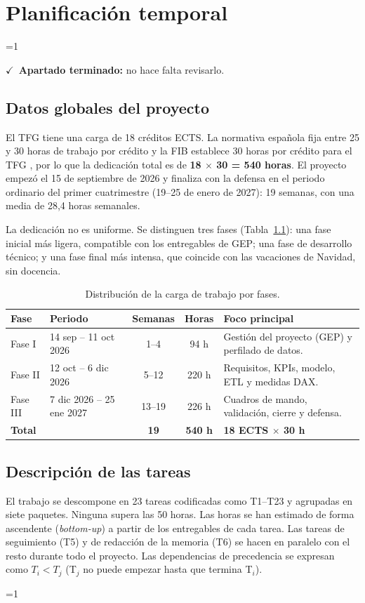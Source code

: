 \documentclass[12pt, a4paper, oneside]{report}
\newcommand{\mostrarterminados}{1}
\newenvironment{revisado}
  {\ifnum\mostrarterminados=1\relax\begin{cajarevisada}\noindent\colorbox{verdeterminado}{\parbox{\dimexpr\linewidth-2\fboxsep\relax}{\small$\checkmark$\ \textbf{Apartado terminado:} no hace falta revisarlo.}}\par\medskip\fi}
  {\ifnum\mostrarterminados=1\relax\end{cajarevisada}\fi}
\begin{document}
\chapter{Planificación temporal}
\begin{revisado}

\section{Datos globales del proyecto}
El TFG tiene una carga de 18 créditos ECTS. La normativa española fija entre 25 y 30 horas de trabajo por crédito \cite{boe_rd1125_2003} y la FIB establece 30 horas por crédito para el TFG \cite{fib_normativa_tfg}, por lo que la dedicación total es de \textbf{18 $\times$ 30 = 540 horas}. El proyecto empezó el 15 de septiembre de 2026 y finaliza con la defensa en el periodo ordinario del primer cuatrimestre (19--25 de enero de 2027): 19 semanas, con una media de 28,4 horas semanales.

La dedicación no es uniforme. Se distinguen tres fases (Tabla~\ref{tab:fases}): una fase inicial más ligera, compatible con los entregables de GEP; una fase de desarrollo técnico; y una fase final más intensa, que coincide con las vacaciones de Navidad, sin docencia.

\begin{table}[H]
\centering
\small
\renewcommand{\arraystretch}{1.1}
\begin{tabularx}{\textwidth}{@{} p{1.6cm} p{4.2cm} c c X @{}}
\toprule
\textbf{Fase} & \textbf{Periodo} & \textbf{Semanas} & \textbf{Horas} & \textbf{Foco principal} \\ \midrule
Fase I & 14 sep -- 11 oct 2026 & 1--4 & 94 h & Gestión del proyecto (GEP) y perfilado de datos. \\
Fase II & 12 oct -- 6 dic 2026 & 5--12 & 220 h & Requisitos, KPIs, modelo, ETL y medidas DAX. \\
Fase III & 7 dic 2026 -- 25 ene 2027 & 13--19 & 226 h & Cuadros de mando, validación, cierre y defensa. \\ \midrule
\textbf{Total} & & \textbf{19} & \textbf{540 h} & \textbf{18 ECTS $\times$ 30 h} \\ \bottomrule
\end{tabularx}
\caption{Distribución de la carga de trabajo por fases.}
\label{tab:fases}
\end{table}

\section{Descripción de las tareas}
El trabajo se descompone en 23 tareas codificadas como T1--T23 y agrupadas en siete paquetes. Ninguna supera las 50 horas. Las horas se han estimado de forma ascendente (\textit{bottom-up}) a partir de los entregables de cada tarea. Las tareas de seguimiento (T5) y de redacción de la memoria (T6) se hacen en paralelo con el resto durante todo el proyecto. Las dependencias de precedencia se expresan como $T_i < T_j$ (T$_j$ no puede empezar hasta que termina T$_i$).


\end{revisado}
\end{document}
